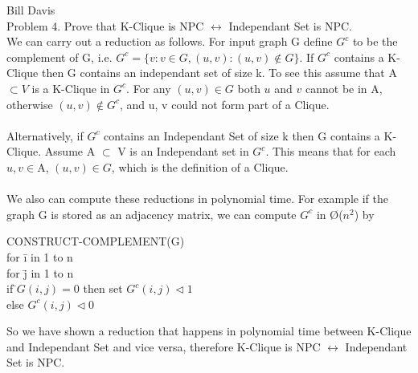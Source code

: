 \documentclass[11pt,fleqn]{article}
\begin{document}
\pagebreak
Bill Davis\\
Problem 4. Prove that K-Clique is NPC $\leftrightarrow$ Independant Set is NPC.  \\

We can carry out a reduction as follows. For input graph G define $G^{c}$ to be the complement of G, i.e. $G^{c} = \{v : v \in G, (u,v) : (u,v) \notin G\}$. If $G^{c}$ contains a K-Clique then G contains an independant set of size k. To see this assume that A $\subset V$ is a K-Clique in $G^{c}$. For any $(u,v) \in G$ both $u$ and $v$ cannot be in A, otherwise $(u,v) \notin G^{c}$, and u, v could not form part of a Clique.\\
\\
Alternatively, if $G^{c}$ contains an Independant Set of size k then G contains a K-Clique. Assume A $\subset$ V is an Independant set in $G^{c}$. This means that for each $u,v \in $A, $(u,v) \in G$, which is the definition of a Clique.\\
\\
We also can compute these reductions in polynomial time. For example if the graph G is stored as an adjacency matrix, we can compute $G^{c}$ in \O($n^{2}$) by
\begin{tabbing}
CONSTRUCT-COMPLEMENT(G)\\
for \=i in 1 to n\\
\> for \=j in 1 to n\\
\> \> if \=$G(i,j) = 0$ then set $G^{c}(i,j) \triangleleft 1$ \\
\> \> \> else  $G^{c}(i,j) \triangleleft 0$\\
\end{tabbing}

So we have shown a reduction that happens in polynomial time between K-Clique and Independant Set and vice versa, therefore K-Clique is NPC $\leftrightarrow$ Independant Set is NPC. 
\end{document}
